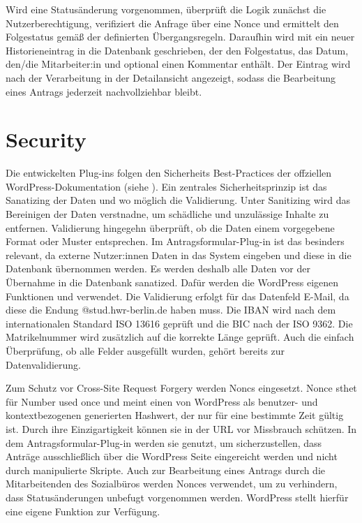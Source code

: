 Wird eine Statusänderung vorgenommen, überprüft die Logik zunächst die Nutzerberechtigung, verifiziert die Anfrage über eine Nonce und ermittelt den Folgestatus gemäß der definierten Übergangsregeln. Daraufhin wird mit  ein neuer Historieneintrag in die Datenbank geschrieben, der den Folgestatus, das Datum, den/die Mitarbeiter:in und optional einen Kommentar enthält. Der Eintrag wird nach der Verarbeitung in der Detailansicht angezeigt, sodass die Bearbeitung eines Antrags jederzeit nachvollziehbar bleibt. 

\section{Security}\label{sec:security}
Die entwickelten Plug-ins folgen den Sicherheits Best-Practices der offziellen WordPress-Dokumentation (siehe ). Ein zentrales Sicherheitsprinzip ist das Sanatizing der Daten und wo möglich die Validierung. Unter Sanitizing wird das Bereinigen der Daten verstnadne, um schädliche und unzulässige Inhalte zu entfernen. Validierung hingegehn überprüft, ob die Daten einem vorgegebene Format oder Muster entsprechen. Im Antragsformular-Plug-in ist das besinders relevant, da externe Nutzer:innen Daten in das System eingeben und diese in die Datenbank übernommen werden. Es werden deshalb alle Daten vor der Übernahme in die Datenbank sanatized. Dafür werden die WordPress eigenen Funktionen  und  verwendet. Die Validierung erfolgt für das Datenfeld E-Mail, da diese die Endung \glqq{}@stud.hwr-berlin.de\grqq{} haben muss. Die IBAN wird nach dem internationalen Standard ISO 13616 geprüft und die BIC nach der ISO 9362. Die Matrikelnummer wird zusätzlich auf die korrekte Länge geprüft. Auch die einfach Überprüfung, ob alle Felder ausgefüllt wurden, gehört bereits zur Datenvalidierung. 

Zum Schutz vor Cross-Site Request Forgery werden Noncs eingesetzt. Nonce sthet für \glqq{}Number used once\grqq{} und meint einen von WordPress als benutzer- und kontextbezogenen generierten Hashwert, der nur für eine bestimmte Zeit gültig ist. Durch ihre Einzigartigkeit können sie in der URL vor Missbrauch schützen. In dem Antragsformular-Plug-in werden sie genutzt, um sicherzustellen, dass Anträge ausschließlich über die WordPress Seite eingereicht werden und nicht durch manipulierte Skripte. Auch zur Bearbeitung eines Antrags durch die Mitarbeitenden des Sozialbüros werden Nonces verwendet, um zu verhindern, dass Statusänderungen unbefugt vorgenommen werden.  WordPress stellt hierfür eine eigene Funktion  zur Verfügung.

